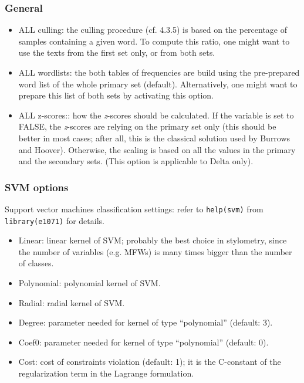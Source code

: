 \documentclass[11pt,a4paper]{article}
\def\margin#1{\marginpar{\textcolor{blue}{\footnotesize\tt #1}}}
\def\code#1{{\tt #1}}
\begin{document}
\subsubsection{General}
\begin{itemize}
\item ALL culling:\margin{culling.of.all.}\margin{samples=}\margin{"TRUE|FALSE"}
the culling procedure (cf. 4.3.5) is based on the percentage of samples 
containing a given word. To compute this ratio, one might want to use the 
texts from the first set only, or from both sets. 

\item ALL wordlists:\margin{reference.wordlist.}\margin{of.all.samples=}\margin{"TRUE|FALSE"}
the both tables of frequencies are build using the pre-prepared word
list of the whole primary set (default). Alternatively, one might
want to prepare this list of both sets by activating this option. 

\item ALL z-scores:\margin{z.scores.of.all. samples=}\margin{"TRUE|FALSE"}:
how the \textit{z}-scores should be calculated. If the variable is set to FALSE,
the \textit{z}-scores are relying on the primary set only (this should be better
in most cases; after all, this is the classical solution used by Burrows
and Hoover). Otherwise, the scaling is based on all the values in
the primary and the secondary sets. (This option is applicable to
Delta only). 
\end{itemize}

\subsubsection{SVM options}

Support vector machines classification settings: refer to \code{help(svm)}
from \code{library(e1071)} for details.
\begin{itemize}
\item Linear:\margin{svm.kernel=}\margin{"linear"}
linear kernel of SVM; probably the best choice in stylometry, since
the number of variables (e.g. MFWs) is many times bigger than the
number of classes. 
\item Polynomial:\margin{"polymonial"} polynomial
kernel of SVM. 
\item Radial:\margin{"radial"} radial kernel
of SVM. 
\item Degree:\margin{svm.degree=}\margin{<integer>} parameter needed
for kernel of type ``polynomial'' (default: 3). 
\item Coef0:\margin{svm.coef0=}\margin{<integer>} parameter needed
for kernel of type ``polynomial'' (default: 0). 
\item Cost:\margin{svm.cost=}\margin{<integer>} cost of constraints
violation (default: 1); it is the C-constant of the regularization
term in the Lagrange formulation. 
\end{itemize}
\end{document}
